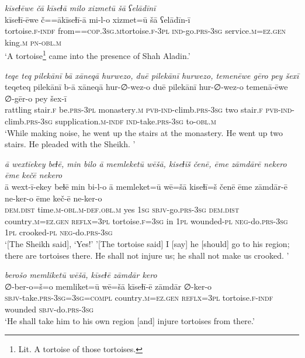 \ea \label{DG.61}
\textit{kīseɫēwe čā kīseɫā milo xizmetū šā ʕelādīnī} \\ 
\gll kīseɫī-ēwe č==ākīseɫī-ā mi-l-o xizmet=ū šā ʕelādīn-ī \\ 
 tortoise\textsc{\textsc{.f}}\textsc{-indf} from=\textsc{=cop}\textsc{.3sg}\textsc{.m}tortoise\textsc{\textsc{.f}}\textsc{-3pl} \textsc{ind-}go\textsc{.prs}\textsc{-3sg} service\textsc{.m}\textsc{=ez}\textsc{.gen} king\textsc{.m} \textsc{pn}\textsc{-obl}\textsc{.m} \\ 
\glt `A tortoise\footnote{Lit. A tortoise of those tortoises.}  came into the presence of Shah Aladin.'
\z 
 
\ea \label{DG.62}
\textit{teqe teq pilekānī bā xāneqā hurwezo, duē pilekānī hurwezo, temenēwe gēro pey šexī} \\ 
\gll teqeteq pilekānī b-ā xāneqā hur-∅-wez-o duē pilekānī hur-∅-wez-o temenā-ēwe ∅-gēr-o pey šex-ī \\ 
 rattling stair\textsc{\textsc{.f}} be\textsc{.prs}\textsc{-3pl} monastery\textsc{.m} \textsc{pvb-}\textsc{ind-}climb\textsc{.prs}\textsc{-3sg} two stair\textsc{\textsc{.f}} \textsc{pvb-}\textsc{ind-}climb\textsc{.prs}\textsc{-3sg} supplication\textsc{.m}\textsc{-indf} \textsc{ind-}take\textsc{.prs}\textsc{-3sg} to\textsc{-obl}\textsc{.m} \\ 
\glt `While making noise, he went up the stairs at the monastery. He went up two stairs. He pleaded with the Sheikh. '
\z 
 
\ea \label{DG.64}
\textit{ā wextīekey beɫē, min bilo ā memleketū wēšā, kiseɫīš čenē, ēme zāmdārē nekero ēme kečē nekero} \\ 
\gll ā wext-ī-ekey beɫē min bi-l-o ā memleket=ū wē=šā kiseɫī=š čenē ēme zāmdār-ē ne-ker-o ēme keč-ē ne-ker-o \\ 
 \textsc{dem.dist} time\textsc{.m}\textsc{-obl}\textsc{.m}\textsc{-def}\textsc{.obl}\textsc{.m} yes \textsc{1sg} \textsc{sbjv-}go\textsc{.prs}\textsc{-3sg} \textsc{dem.dist} country\textsc{.m}\textsc{=ez}\textsc{.gen} \textsc{reflx}\textsc{=3pl} tortoise\textsc{\textsc{.f}}\textsc{=3sg} in \textsc{1pl} wounded\textsc{\textsc{-pl}} \textsc{neg-}do\textsc{.prs}\textsc{-3sg} \textsc{1pl} crooked\textsc{\textsc{-pl}} \textsc{neg-}do\textsc{.prs}\textsc{-3sg} \\ 
\glt `[The Sheikh said], ‘Yes!' '[The tortoise said] I [say] he [should] go to his region; there are tortoises there. He shall not injure us; he shall not make us crooked. '
\z 
 
\ea \label{DG.65}
\textit{berošo memliketū wēšā, kīseɫē zāmdār kero} \\ 
\gll ∅-ber-o=š=o memliket=ū wē=šā kīseɫī-ē zāmdār ∅-ker-o \\ 
 \textsc{sbjv-}take\textsc{.prs}\textsc{-3sg}\textsc{=3sg}\textsc{=\textsc{compl}} country\textsc{.m}\textsc{=ez}\textsc{.gen} \textsc{reflx}\textsc{=3pl} tortoise\textsc{\textsc{.f}}\textsc{-indf} wounded \textsc{sbjv-}do\textsc{.prs}\textsc{-3sg} \\ 
\glt `He shall take him to his own region [and] injure tortoises from there.'
\z 
 
